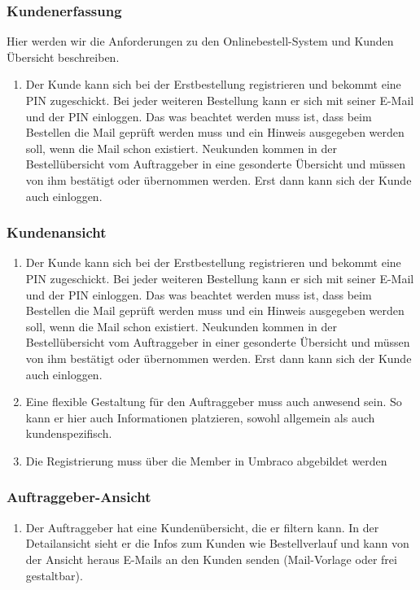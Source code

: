 \subsubsection{Kundenerfassung}
Hier werden wir die Anforderungen zu den Onlinebestell-System und Kunden Übersicht beschreiben.
\begin{enumerate}
	\item Der Kunde kann sich bei der Erstbestellung registrieren und bekommt eine PIN zugeschickt. Bei jeder weiteren Bestellung kann er sich mit seiner E-Mail und der PIN einloggen. Das was beachtet werden muss ist, dass beim Bestellen die Mail geprüft werden muss und ein Hinweis ausgegeben werden soll, wenn die Mail schon existiert. Neukunden kommen in der Bestellübersicht vom Auftraggeber in eine gesonderte Übersicht und müssen von ihm bestätigt oder übernommen werden. Erst dann kann sich der Kunde auch einloggen.
\end{enumerate} 

\subsubsection{Kundenansicht}

\begin{enumerate}
	\item Der Kunde kann sich bei der Erstbestellung registrieren und bekommt eine PIN zugeschickt. Bei jeder weiteren Bestellung kann er sich mit seiner E-Mail und der PIN einloggen. Das was beachtet werden muss ist, dass beim Bestellen die Mail geprüft werden muss und ein Hinweis ausgegeben werden soll, wenn die Mail schon existiert. Neukunden kommen in der Bestellübersicht vom Auftraggeber in einer gesonderte Übersicht und müssen von ihm bestätigt oder übernommen werden. Erst dann kann sich der Kunde auch einloggen.
	\item Eine flexible Gestaltung für den Auftraggeber muss auch anwesend sein. So kann er hier auch Informationen platzieren, sowohl allgemein als auch kundenspezifisch.
	\item Die Registrierung muss über die Member in Umbraco abgebildet werden
\end{enumerate} 

\subsubsection{Auftraggeber-Ansicht}

\begin{enumerate}
\item Der Auftraggeber hat eine Kundenübersicht, die er filtern kann. In der Detailansicht sieht er die Infos zum Kunden wie Bestellverlauf und kann von der Ansicht heraus E-Mails an den Kunden senden (Mail-Vorlage oder frei gestaltbar).
\end{enumerate} 

